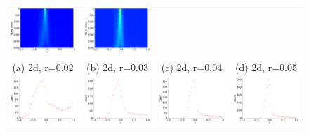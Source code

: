 \documentclass[senior,final,11pt]{iscs-thesis}
\begin{document}
\begin{figure}[htbp]
\begin{tabular}{cccc}
    \includegraphics[width=45mm]{figure/random_geometric_graph_n3000_radius004_dim2txt_pdos.png} &
    \includegraphics[width=45mm]{figure/random_geometric_graph_n3000_radius005_dim2txt_pdos.png} \\
    (a) 2d, r=0.02 & (b) 2d, r=0.03& (c) 2d, r=0.04 & (d) 2d, r=0.05\\ [6pt]
    \includegraphics[width=45mm]{figure/random_geometric_graph_n3000_radius008_dim3txt_dos.png} &
    \includegraphics[width=45mm]{figure/random_geometric_graph_n3000_radius01_dim3txt_dos.png} &
    \includegraphics[width=45mm]{figure/random_geometric_graph_n3000_radius012_dim3txt_dos.png} &
    \includegraphics[width=45mm]{figure/random_geometric_graph_n3000_radius014_dim3txt_dos.png} \\

\end{tabular}
\end{figure}
\end{document}
